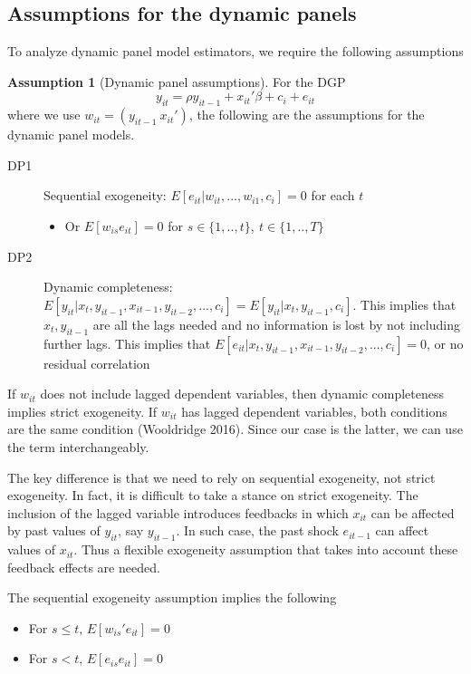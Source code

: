 \documentclass[12pt]{article}
\theoremstyle{definition}
\theoremstyle{property}
\theoremstyle{assumption}
\newtheorem{assumption}{Assumption}[section]
\theoremstyle{example}
\theoremstyle{comment}
\begin{document}
\subsection{Assumptions for the dynamic panels}
To analyze dynamic panel model estimators, we require the following assumptions
\begin{mdframed}[backgroundcolor=blue!5] 
\begin{assumption}[Dynamic panel assumptions]
For the DGP
\[
y_{it} = \rho y_{it-1} + x_{it}'\beta+c_i + e_{it}
\]
where we use $w_{it} = (y_{it-1} \ x_{it}')$, the following are the assumptions for the dynamic panel models.
\begin{description}
\item[DP1] Sequential exogeneity: $E[e_{it}|w_{it},...,w_{i1},c_i]=0$ for each $t$
\begin{itemize}
\item Or $E[w_{is}e_{it}]=0$ for $s\in\{1,..,t\}, \ t\in\{1,..,T\}$
\end{itemize}
\item[DP2] Dynamic completeness: $E[y_{it}|x_t, y_{it-1}, x_{it-1}, y_{it-2},...,c_i]=E[y_{it}|x_t, y_{it-1},c_i]$. This implies that $x_t, y_{it-1}$ are all the lags needed and no information is lost by not including further lags. This implies that $E[e_{it}|x_t, y_{it-1}, x_{it-1}, y_{it-2},...,c_i]=0$, or no residual correlation
\end{description}
\end{assumption}
\end{mdframed}
If $w_{it}$ does not include lagged dependent variables, then dynamic completeness implies strict exogeneity. If $w_{it}$ has lagged dependent variables, both conditions are the same condition (Wooldridge 2016). Since our case is the latter, we can use the term interchangeably. 
\par
The key difference is that we need to rely on sequential exogeneity, not strict exogeneity. In fact, it is difficult to take a stance on strict exogeneity. The inclusion of the lagged variable introduces feedbacks in which $x_{it}$ can be affected by past values of $y_{it}$, say $y_{it-1}$. In such case, the past shock $e_{it-1}$ can affect values of $x_{it}$. Thus a flexible exogeneity assumption that takes into account these feedback effects are needed.
\par
The sequential exogeneity assumption implies the following
\begin{itemize}
\item For $s\leq t$, $E[w_{is}'e_{it}]=0$
\item For $s< t$, $E[e_{is}e_{it}]=0$
\end{itemize}
\end{document}
